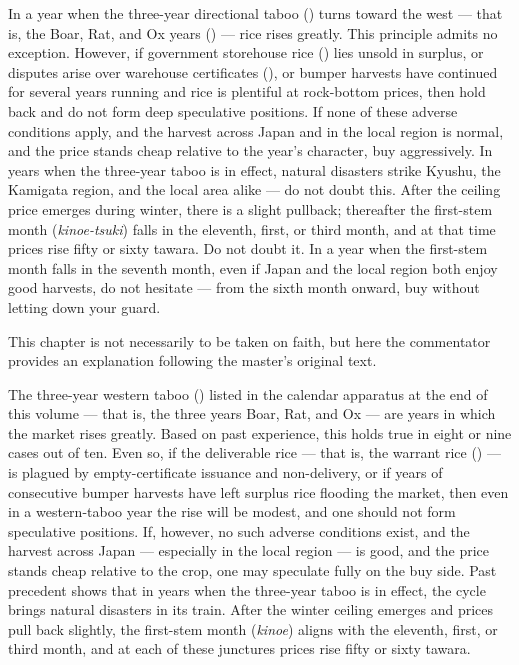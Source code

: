 \begin{sokyubox}
{\small\itshape\color{sokyubar} }

\medskip
In a year when the three-year directional taboo ()
turns toward the west --- that is, the Boar, Rat, and Ox years
() --- rice rises greatly. This principle admits
no exception. However, if government storehouse rice
() lies unsold in surplus, or disputes arise over
warehouse certificates (), or bumper harvests have
continued for several years running and rice is plentiful at rock-bottom
prices, then hold back and do not form deep speculative positions.
If none of these adverse conditions apply, and the harvest across
Japan and in the local region is normal, and the price stands cheap
relative to the year's character, buy aggressively. In years when
the three-year taboo is in effect, natural disasters strike Kyushu,
the Kamigata region, and the local area alike --- do not doubt this.
After the ceiling price emerges during winter, there is a slight
pullback; thereafter the first-stem month (\textit{kinoe-tsuki}) falls in
the eleventh, first, or third month, and at that time prices rise
fifty or sixty tawara. Do not doubt it. In a year when the
first-stem month falls in the seventh month, even if Japan and the
local region both enjoy good harvests, do not hesitate --- from the
sixth month onward, buy without letting down your guard.
\end{sokyubox}

\commentary
This chapter is not necessarily to be taken on faith, but here the
commentator provides an explanation following the master's original text.

The three-year western taboo () listed in the calendar
apparatus at the end of this volume --- that is, the three years
Boar, Rat, and Ox --- are years in which the market rises greatly.
Based on past experience, this holds true in eight or nine cases out
of ten. Even so, if the deliverable rice --- that is, the warrant
rice () --- is plagued by empty-certificate issuance
and non-delivery, or if years of consecutive bumper harvests have
left surplus rice flooding the market, then even in a western-taboo
year the rise will be modest, and one should not form speculative
positions. If, however, no such adverse conditions exist, and the
harvest across Japan --- especially in the local region --- is good,
and the price stands cheap relative to the crop, one may speculate
fully on the buy side. Past precedent shows that in years when the
three-year taboo is in effect, the cycle brings natural disasters in
its train. After the winter ceiling emerges and prices pull back
slightly, the first-stem month (\textit{kinoe}) aligns with the eleventh,
first, or third month, and at each of these junctures prices rise
fifty or sixty tawara.

